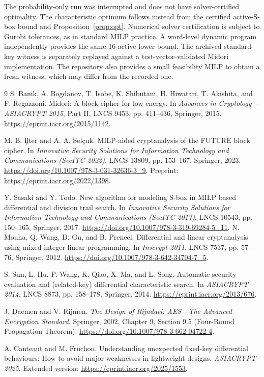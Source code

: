 \documentclass[11pt,a4paper]{article}
\begin{document}
The probability-only run was interrupted and does not have solver-certified
optimality. The characteristic optimum follows instead from the certified active-S-box bound and
Proposition~\ref{prop:opt}. Numerical solver certification is subject to
Gurobi tolerances, as in standard MILP practice. A word-level dynamic program independently
provides the same 16-active lower bound. The archived standard-key witness is separately replayed against a
test-vector-validated Midori implementation. The repository also provides a
small feasibility MILP to obtain a fresh witness, which may differ from
the recorded one.

\begin{thebibliography}{9}
S. Banik, A. Bogdanov, T. Isobe, K. Shibutani, H. Hiwatari, T. Akishita,
and F. Regazzoni.
\newblock Midori: A block cipher for low energy.
\newblock In \emph{Advances in Cryptology---ASIACRYPT 2015}, Part II,
LNCS 9453, pp. 411--436, Springer, 2015.
\newblock \url{https://eprint.iacr.org/2015/1142}.

M. B. \c{I}lter and A. A. Sel\c{c}uk.
\newblock MILP-aided cryptanalysis of the FUTURE block cipher.
\newblock In \emph{Innovative Security Solutions for Information Technology
and Communications (SecITC 2022)}, LNCS 13809, pp. 153--167,
Springer, 2023.
\newblock \url{https://doi.org/10.1007/978-3-031-32636-3_9}.
\newblock Preprint: \url{https://eprint.iacr.org/2022/1398}.

Y. Sasaki and Y. Todo.
\newblock New algorithm for modeling S-box in MILP based differential and
division trail search.
\newblock In \emph{Innovative Security Solutions for Information Technology
and Communications (SecITC 2017)}, LNCS 10543, pp. 150--165, Springer, 2017.
\newblock \url{https://doi.org/10.1007/978-3-319-69284-5_11}.
N. Mouha, Q. Wang, D. Gu, and B. Preneel.
\newblock Differential and linear cryptanalysis using mixed-integer linear programming.
\newblock In \emph{Inscrypt 2011}, LNCS 7537, pp. 57--76, Springer, 2012.
\newblock \url{https://doi.org/10.1007/978-3-642-34704-7_5}.

S. Sun, L. Hu, P. Wang, K. Qiao, X. Ma, and L. Song.
\newblock Automatic security evaluation and (related-key) differential characteristic search.
\newblock In \emph{ASIACRYPT 2014}, LNCS 8873, pp. 158--178, Springer, 2014.
\newblock \url{https://eprint.iacr.org/2013/676}.

J. Daemen and V. Rijmen.
\newblock \emph{The Design of Rijndael: AES---The Advanced Encryption Standard}.
\newblock Springer, 2002, Chapter 9, Section 9.5 (Four-Round Propagation Theorem).
\newblock \url{https://doi.org/10.1007/978-3-662-04722-4}.

A. Canteaut and M. Fruchon.
\newblock Understanding unexpected fixed-key differential behaviours: How to avoid major weaknesses in lightweight designs.
\newblock \emph{ASIACRYPT 2025}. Extended version: \url{https://eprint.iacr.org/2025/1553}.
\end{thebibliography}
\end{document}
